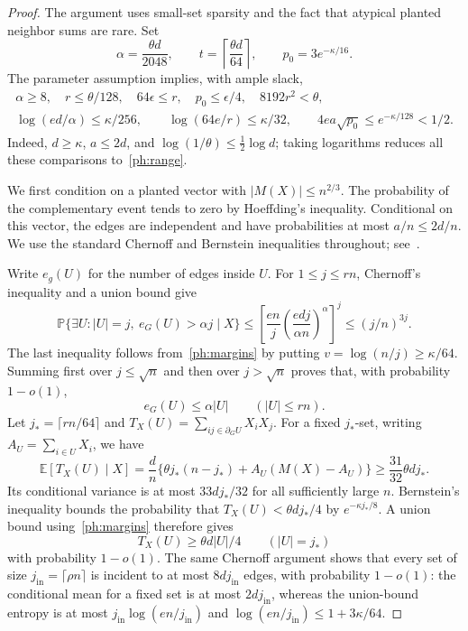 \documentclass[11pt]{article}
\def\P{\mathbb{P}}
\def\E{\mathbb{E}}
\numberwithin{equation}{section}
\begin{document}
\begin{proof}
The argument uses small-set sparsity and the fact that atypical planted neighbor sums are rare. Set
\[
    \alpha=\frac{\theta d}{2048},\qquad
    t=\left\lceil\frac{\theta d}{64}\right\rceil,\qquad
    p_0=3e^{-\kappa/16}.
\]
The parameter assumption implies, with ample slack,
\begin{equation}\label{ph:margins}
\begin{gathered}
 \alpha\ge8,\quad r\le\theta/128,\quad 64\epsilon\le r,
 \quad p_0\le\epsilon/4,\quad 8192r^2<\theta,\\
 \log(ed/\alpha)\le\kappa/256,
 \qquad \log(64e/r)\le\kappa/32,
 \qquad 4ea\sqrt{p_0}\le e^{-\kappa/128}<1/2.
\end{gathered}
\end{equation}
Indeed, $d\ge\kappa$, $a\le2d$, and $\log(1/\theta)\le\frac12\log d$; taking logarithms reduces all these comparisons to~\eqref{ph:range}.

We first condition on a planted vector with $|M(X)|\le n^{2/3}$. The probability of the complementary event tends to zero by Hoeffding's inequality. Conditional on this vector, the edges are independent and have probabilities at most $a/n\le2d/n$. We use the standard Chernoff and Bernstein inequalities throughout; see~\cite[Chapter~2]{BLM13}.

Write $e_g(U)$ for the number of edges inside $U$. For $1\le j\le rn$, Chernoff's inequality and a union bound give
\[
 \P\{\exists U:|U|=j,\ e_G(U)>\alpha j\mid X\}
 \le\left[\frac{en}{j}\left(\frac{edj}{\alpha n}\right)^\alpha\right]^j
 \le (j/n)^{3j}.
\]
The last inequality follows from~\eqref{ph:margins} by putting $v=\log(n/j)\ge\kappa/64$. Summing first over $j\le\sqrt n$ and then over $j>\sqrt n$ proves that, with probability $1-o(1)$,
\begin{equation}\label{ph:sparsity}
    e_G(U)\le\alpha|U|\qquad (|U|\le rn).
\end{equation}
Let $j_* =\lceil rn/64\rceil$ and
$T_X(U)=\sum_{ij\in\partial_G U}X_iX_j$. For a fixed $j_*$-set, writing $A_U=\sum_{i\in U}X_i$, we have
\[
 \E[T_X(U)\mid X]
 =\frac d n\{\theta j_*(n-j_*)+A_U(M(X)-A_U)\}
 \ge \frac{31}{32}\theta d j_*.
\]
Its conditional variance is at most $33dj_*/32$ for all sufficiently large $n$. Bernstein's inequality bounds the probability that $T_X(U)<\theta d j_*/4$ by $e^{-\kappa j_*/8}$. A union bound using~\eqref{ph:margins} therefore gives
\begin{equation}\label{ph:barrier}
    T_X(U)\ge\theta d|U|/4\qquad (|U|=j_*)
\end{equation}
with probability $1-o(1)$. The same Chernoff argument shows that every set of size $j_{\mathrm{in}}=\lceil\rho n\rceil$ is incident to at most $8dj_{\mathrm{in}}$ edges, with probability $1-o(1)$: the conditional mean for a fixed set is at most $2dj_{\mathrm{in}}$, whereas the union-bound entropy is at most $j_{\mathrm{in}}\log(en/j_{\mathrm{in}})$ and $\log(en/j_{\mathrm{in}})\le1+3\kappa/64$.


\end{proof}
\end{document}
